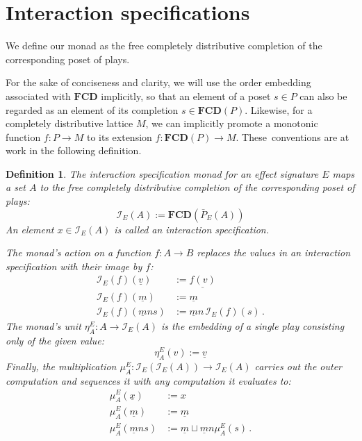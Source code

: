 \documentclass[draft,11pt]{report}
\newtheorem{definition}{Definition}
\begin{document}
\section{Interaction specifications} %

We define our monad as the free completely distributive completion
of the corresponding poset of plays.

For the sake of conciseness and clarity,
we will use the order embedding associated with $\mathbf{FCD}$
implicitly,
so that an element of a poset $s \in P$
can also be regarded as an element of
its completion $s \in \mathbf{FCD}(P)$.
Likewise,
for a completely distributive lattice $M$,
we can implicitly
promote a monotonic function
$f : P \rightarrow M$
to its extension
$f : \mathbf{FCD}(P) \rightarrow M$.
These~conventions are at work
in the following definition.

\begin{definition} \label{def:intm} %
The \emph{interaction specification monad}
for an effect signature $E$
maps a set $A$
to the free completely distributive completion
of the corresponding poset of plays:
\[
    \mathcal{I}_E(A) :=
      \mathbf{FCD}(\bar{P}_E(A))
\]
An element $x \in \mathcal{I}_E(A)$ is called
an \emph{interaction specification}.

The monad's action on a function $f : A \rightarrow B$
replaces the values in
an interaction specification with their image by $f$:
\begin{align*}
  \mathcal{I}_E(f)(\underline{v}) &:= \underline{f(v)} \\
  \mathcal{I}_E(f)(\underline{m}) &:= \underline{m} \\
  \mathcal{I}_E(f)(\underline{m} n s) &:=
    \underline{m} n \, \mathcal{I}_E(f)(s) \,.
\end{align*}
The monad's unit
$\eta^E_A : A \rightarrow \mathcal{I}_E(A)$
is the embedding of a single play
consisting only of the given value:
\[
    \eta^E_A(v) := \underline{v}
\]
Finally, the multiplication
$\mu^E_A : \mathcal{I}_E(\mathcal{I}_E(A)) \rightarrow \mathcal{I}_E(A)$
carries out the outer computation and
sequences it with any computation it evaluates to:
\begin{align*}
  \mu^E_A(\underline{x}) &:= x \\
  \mu^E_A(\underline{m}) &:= \underline{m} \\
  \mu^E_A(\underline{m} n s) &:=
    \underline{m} \sqcup \underline{m} n \mu^E_A(s) \,.
\end{align*}
\end{definition}
\end{document}
